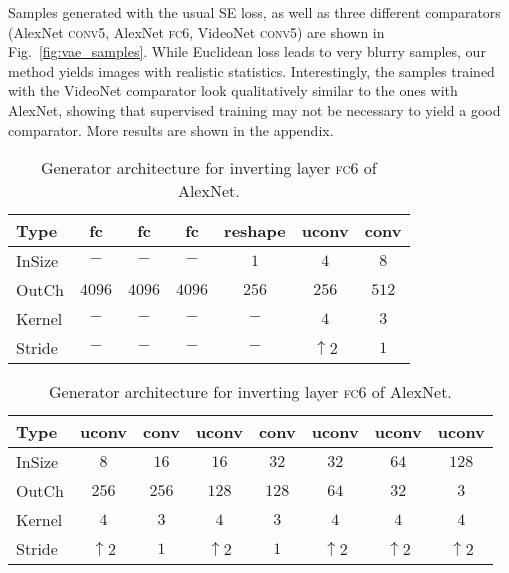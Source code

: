 \documentclass{article}
\newcommand{\conv}{\textsc{conv}}
\newcommand{\fc}{\textsc{fc}}
\newcommand{\ltwo}{SE }
\begin{document}
Samples generated with the usual \ltwo loss, as well as three different comparators (AlexNet \conv5, AlexNet \fc6, VideoNet \conv5) are shown in Fig.~\ref{fig:vae_samples}.
While Euclidean loss leads to very blurry samples, our method yields images with realistic statistics.
Interestingly, the samples trained with the VideoNet comparator look qualitatively similar to the ones with AlexNet, showing that supervised training may not be necessary to yield a good comparator.
More results are shown in the appendix.

\begin{table}
   \begin{center}
   \setlength{\tabcolsep}{0.15cm}
  \small{
  \begin{tabular}{|l|cccccc|}
      \hline
      \small{Type}   & fc     & fc     & fc     & reshape & uconv         & conv  \\ \hline
      \small{InSize} & $-$    & $-$    & $-$    & $1$     & $4$            & $8$   \\
      \small{OutCh}  & $4096$ & $4096$ & $4096$ & $256$   & $256$          & $512$ \\
      \small{Kernel} & $-$    & $-$    & $-$    & $-$     & $4$            & $3$   \\
      \small{Stride} & $-$    & $-$    & $-$    & $-$     & $\uparrow \!2$ & $1$   \\
      \hline
    \end{tabular}}
\vspace{0.1cm}
   \setlength{\tabcolsep}{0.1cm}
  \small{
  \begin{tabular}{|l|ccccccc|}
      \hline
      \small{Type}   & uconv            & conv  & uconv          & conv  & uconv          & uconv            & uconv          \\ \hline
      \small{InSize} & $8$              & $16$  & $16$           & $32$  & $32$           & $64$             & $128$          \\
      \small{OutCh}  & $256$            & $256$ & $128$          & $128$ & $64$           & $32$             & $3$          \\
      \small{Kernel} & $4$              & $3$   & $4$            & $3$   & $4$            & $4$              & $4$            \\
      \small{Stride} & $\uparrow \!2$   & $1$   & $\uparrow \!2$ & $1$   & $\uparrow \!2$ & $\uparrow \!2$   & $\uparrow \!2$ \\
      \hline
    \end{tabular}}
  \end{center}
  \caption{Generator architecture for inverting layer \fc6 of AlexNet. }
  \label{tbl:generator_arch}
\end{table}
\end{document}
